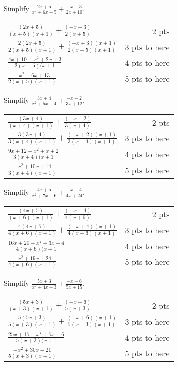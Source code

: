 {
	Simplify $\displaystyle \frac{2x+5}{x^2+6x+5} + \frac{-x+3}{2x+10}$.
}
{
	\begin{tabular}{l r}
	$\frac{(2x+5)}{(x+5)(x+1)} + \frac{(-x+3)}{2(x+5)}$ & 2 pts\\
	$\frac{2(2x+5)}{2(x+5)(x+1)} + \frac{(-x+3)(x+1)}{2(x+5)(x+1)}$ & 3 pts to here\\
	$\frac{4x+10-x^2+2x+3}{2(x+5)(x+1}$ & 4 pts to here\\
	$\frac{-x^2+6x+13}{2(x+5)(x+1)}$ & 5 pts to here
	\end{tabular}
}

{
	Simplify $\displaystyle \frac{3x+4}{x^2+5x+4} + \frac{-x+2}{3x+12}$.
}
{
	\begin{tabular}{l r}
	$\frac{(3x+4)}{(x+4)(x+1)} + \frac{(-x+2)}{3(x+4)}$ & 2 pts\\
	$\frac{3(3x+4)}{3(x+4)(x+1)} + \frac{(-x+2)(x+1)}{3(x+4)(x+1)}$ & 3 pts to here\\
	$\frac{9x+12-x^2+x+2}{3(x+4)(x+1}$ & 4 pts to here\\
	$\frac{-x^2+10x+14}{3(x+4)(x+1)}$ & 5 pts to here
	\end{tabular}
}

{
	Simplify $\displaystyle \frac{4x+5}{x^2+7x+6} + \frac{-x+4}{4x+24}$.
}
{
	\begin{tabular}{l r}
	$\frac{(4x+5)}{(x+6)(x+1)} + \frac{(-x+4)}{4(x+6)}$ & 2 pts\\
	$\frac{4(4x+5)}{4(x+6)(x+1)} + \frac{(-x+4)(x+1)}{4(x+6)(x+1)}$ & 3 pts to here\\
	$\frac{16x+20-x^2+3x+4}{4(x+6)(x+1}$ & 4 pts to here\\
	$\frac{-x^2+19x+24}{4(x+6)(x+1)}$ & 5 pts to here
	\end{tabular}
}

{
	Simplify $\displaystyle \frac{5x+3}{x^2+4x+3} + \frac{-x+6}{5x+15}$.
}
{
	\begin{tabular}{l r}
	$\frac{(5x+3)}{(x+3)(x+1)} + \frac{(-x+6)}{5(x+3)}$ & 2 pts\\
	$\frac{5(5x+3)}{5(x+3)(x+1)} + \frac{(-x+6)(x+1)}{5(x+3)(x+1)}$ & 3 pts to here\\
	$\frac{25x+15-x^2+5x+6}{5(x+3)(x+1}$ & 4 pts to here\\
	$\frac{-x^2+30x+21}{5(x+3)(x+1)}$ & 5 pts to here
	\end{tabular}
}
